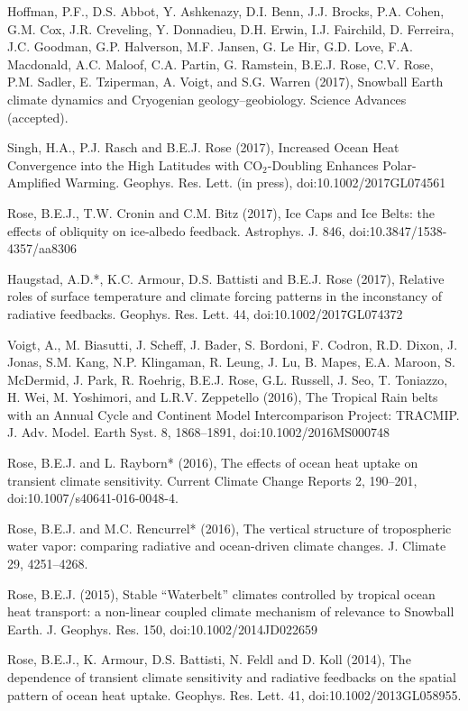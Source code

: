 \documentclass[11pt, letterpaper]{article} %
\newcommand{\years}[1]{\marginnote{\scriptsize #1}} %
\begin{document}
\years{2017}  Hoffman, P.F., D.S. Abbot, Y. Ashkenazy, D.I. Benn, J.J. Brocks, P.A. Cohen, G.M.
  Cox, J.R. Creveling, Y. Donnadieu, D.H. Erwin, I.J. Fairchild, D.
  Ferreira, J.C. Goodman, G.P. Halverson, M.F. Jansen, G. Le Hir, G.D.
  Love, F.A. Macdonald, A.C. Maloof, C.A. Partin, G. Ramstein, B.E.J.
  Rose, C.V. Rose, P.M. Sadler, E. Tziperman, A. Voigt, and S.G. Warren (2017),
  Snowball Earth climate dynamics and Cryogenian geology--geobiology.
  Science Advances (accepted).

\years{2017}  Singh, H.A., P.J. Rasch and B.E.J. Rose (2017), Increased Ocean Heat Convergence into the High Latitudes with CO$_2$-Doubling Enhances Polar-Amplified Warming. Geophys. Res. Lett. (in press), doi:10.1002/2017GL074561

\years{2017}  Rose, B.E.J., T.W. Cronin and C.M. Bitz (2017), Ice Caps and Ice Belts: the effects of obliquity on ice-albedo feedback. Astrophys. J. 846, doi:10.3847/1538-4357/aa8306

\years{2017} Haugstad, A.D.*, K.C. Armour, D.S. Battisti and B.E.J. Rose (2017), Relative roles of surface temperature and climate forcing patterns in the inconstancy of radiative feedbacks. Geophys. Res. Lett. 44, doi:10.1002/2017GL074372

\years{2016}
  Voigt, A., M. Biasutti, J. Scheff, J. Bader, S. Bordoni, F. Codron,
  R.D. Dixon, J. Jonas, S.M. Kang, N.P. Klingaman, R. Leung, J. Lu, B.
  Mapes, E.A. Maroon, S. McDermid, J. Park, R. Roehrig, B.E.J. Rose,
  G.L. Russell, J. Seo, T. Toniazzo, H. Wei, M. Yoshimori, and L.R.V.
  Zeppetello (2016), The Tropical Rain belts with an Annual Cycle and
  Continent Model Intercomparison Project: TRACMIP. J. Adv. Model. Earth
  Syst. 8, 1868--1891, doi:10.1002/2016MS000748
 
\years{2016}  Rose, B.E.J. and L. Rayborn* (2016), The effects of ocean heat uptake on
  transient climate sensitivity. Current Climate Change Reports 2,
  190--201, doi:10.1007/s40641-016-0048-4.
   
\years{2016}  Rose, B.E.J. and M.C. Rencurrel* (2016), The vertical structure of
  tropospheric water vapor: comparing radiative and ocean-driven climate
  changes. J. Climate 29, 4251--4268.
   
\years{2015}  Rose, B.E.J. (2015), Stable ``Waterbelt'' climates controlled by tropical
  ocean heat transport: a non-linear coupled climate mechanism of
  relevance to Snowball Earth. J. Geophys. Res. 150,
  doi:10.1002/2014JD022659
  
\years{2014}  Rose, B.E.J., K. Armour, D.S. Battisti, N. Feldl and D. Koll (2014), The
  dependence of transient climate sensitivity and radiative feedbacks on
  the spatial pattern of ocean heat uptake. Geophys. Res. Lett. 41,
  doi:10.1002/2013GL058955.
  
\end{document}
